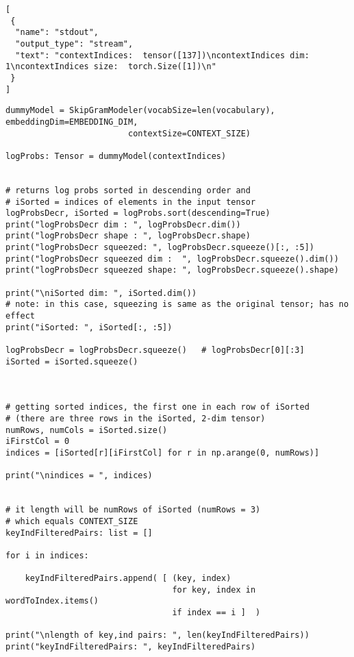 \documentclass[
]{article}
\begin{document}
\begin{verbatim}
[
 {
  "name": "stdout",
  "output_type": "stream",
  "text": "contextIndices:  tensor([137])\ncontextIndices dim:  1\ncontextIndices size:  torch.Size([1])\n"
 }
]
\end{verbatim}

\begin{verbatim}
dummyModel = SkipGramModeler(vocabSize=len(vocabulary), embeddingDim=EMBEDDING_DIM,
                         contextSize=CONTEXT_SIZE)

logProbs: Tensor = dummyModel(contextIndices)


# returns log probs sorted in descending order and
# iSorted = indices of elements in the input tensor
logProbsDecr, iSorted = logProbs.sort(descending=True)
print("logProbsDecr dim : ", logProbsDecr.dim())
print("logProbsDecr shape : ", logProbsDecr.shape)
print("logProbsDecr squeezed: ", logProbsDecr.squeeze()[:, :5])
print("logProbsDecr squeezed dim :  ", logProbsDecr.squeeze().dim())
print("logProbsDecr squeezed shape: ", logProbsDecr.squeeze().shape)

print("\niSorted dim: ", iSorted.dim())
# note: in this case, squeezing is same as the original tensor; has no effect
print("iSorted: ", iSorted[:, :5])

logProbsDecr = logProbsDecr.squeeze()   # logProbsDecr[0][:3]
iSorted = iSorted.squeeze()



# getting sorted indices, the first one in each row of iSorted
# (there are three rows in the iSorted, 2-dim tensor)
numRows, numCols = iSorted.size()
iFirstCol = 0
indices = [iSorted[r][iFirstCol] for r in np.arange(0, numRows)]

print("\nindices = ", indices)


# it length will be numRows of iSorted (numRows = 3)
# which equals CONTEXT_SIZE
keyIndFilteredPairs: list = []

for i in indices:

    keyIndFilteredPairs.append( [ (key, index)
                                  for key, index in wordToIndex.items()
                                  if index == i ]  )

print("\nlength of key,ind pairs: ", len(keyIndFilteredPairs))
print("keyIndFilteredPairs: ", keyIndFilteredPairs)
\end{verbatim}
\end{document}
